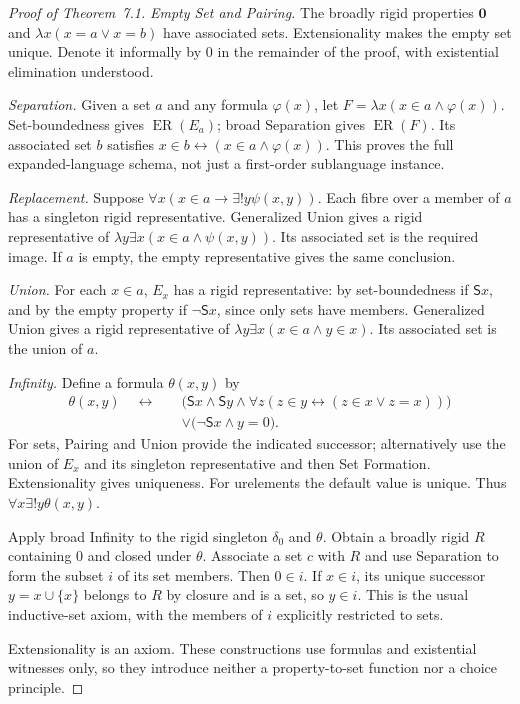 \documentclass[11pt]{article}
\theoremstyle{definition}
\newcommand{\ER}{\operatorname{ER}}
\newcommand{\Z}{\mathbf 0}
\newcommand{\sng}[1]{\delta_{#1}}
\numberwithin{equation}{section}
\begin{document}
\begin{proof}[Proof of Theorem~7.1]
\emph{Empty Set and Pairing.} The broadly rigid properties $\Z$ and $\lambda x(x=a\vee x=b)$ have associated sets. Extensionality makes the empty set unique. Denote it informally by $0$ in the remainder of the proof, with existential elimination understood.

\emph{Separation.} Given a set $a$ and any formula $\varphi(x)$, let $F=\lambda x(x\in a\wedge\varphi(x))$. Set-boundedness gives $\ER(E_a)$; broad Separation gives $\ER(F)$. Its associated set $b$ satisfies $x\in b\leftrightarrow(x\in a\wedge\varphi(x))$. This proves the full expanded-language schema, not just a first-order sublanguage instance.

\emph{Replacement.} Suppose $\forall x(x\in a\rightarrow\exists!y\psi(x,y))$. Each fibre over a member of $a$ has a singleton rigid representative. Generalized Union gives a rigid representative of $\lambda y\exists x(x\in a\wedge\psi(x,y))$. Its associated set is the required image. If $a$ is empty, the empty representative gives the same conclusion.

\emph{Union.} For each $x\in a$, $E_x$ has a rigid representative: by set-boundedness if $\mathsf Sx$, and by the empty property if $\neg\mathsf Sx$, since only sets have members. Generalized Union gives a rigid representative of $\lambda y\exists x(x\in a\wedge y\in x)$. Its associated set is the union of $a$.

\emph{Infinity.} Define a formula $\theta(x,y)$ by
$$
\begin{aligned}
\theta(x,y)\quad\leftrightarrow\quad
&\bigl(\mathsf Sx\wedge\mathsf Sy\wedge
       \forall z(z\in y\leftrightarrow(z\in x\vee z=x))\bigr)\\
&\vee\bigl(\neg\mathsf Sx\wedge y=0\bigr).
\end{aligned}
$$
For sets, Pairing and Union provide the indicated successor; alternatively use the union of $E_x$ and its singleton representative and then Set Formation. Extensionality gives uniqueness. For urelements the default value is unique. Thus $\forall x\exists!y\theta(x,y)$.

Apply broad Infinity to the rigid singleton $\sng 0$ and $\theta$. Obtain a broadly rigid $R$ containing $0$ and closed under $\theta$. Associate a set $c$ with $R$ and use Separation to form the subset $i$ of its set members. Then $0\in i$. If $x\in i$, its unique successor $y=x\cup\{x\}$ belongs to $R$ by closure and is a set, so $y\in i$. This is the usual inductive-set axiom, with the members of $i$ explicitly restricted to sets.

Extensionality is an axiom. These constructions use formulas and existential witnesses only, so they introduce neither a property-to-set function nor a choice principle.
\end{proof}
\end{document}
